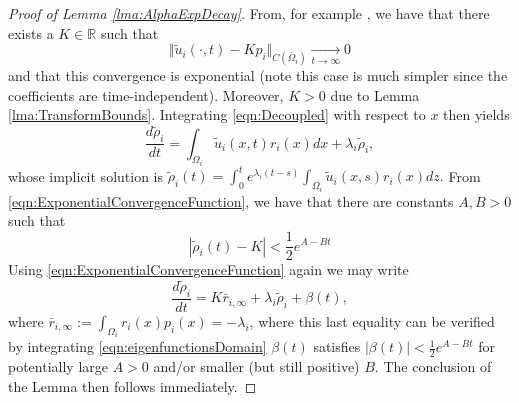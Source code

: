 \documentclass{article}
\def\strutdepth{\dp\strutbox}
\def \BVR#1{\strut\vadjust{\kern-\strutdepth\vtop to0pt{\vss\hbox to\hsize {\hskip\hsize\hskip5pt$\leftarrow$\hss\strut}}}{\em \textcolor{blue}{#1}}}
\begin{document}
\begin{proof}[Proof of Lemma \ref{lma:AlphaExpDecay}]
   From, for example \cite[Theorem 4.2.2]{lam2022introduction}, we have that there exists a
  $K\in\mathbb{R}$  such that \begin{equation}\label{eqn:ExponentialConvergenceFunction}
      \Vert{}\tilde{u}_i(\cdot,t)-Kp_i\Vert_{C(\overline{\Omega}_i)}\xrightarrow[t\rightarrow\infty]{}0
  \end{equation}and that this convergence is exponential (note this case is much simpler since the coefficients are time-independent). Moreover, $K>0$ due to Lemma \ref{lma:TransformBounds}. Integrating \eqref{eqn:Decoupled} with respect to $x$ then yields
  \[\frac{d\tilde{\rho}_i}{dt}=\int_{\Omega_i}\tilde{u}_i(x,t)r_i(x)dx+\lambda_i\tilde{\rho}_i,\]
whose implicit solution is $\tilde{\rho}_i(t)=\int_{0}^{t}e^{\lambda_i(t-s)}\int_{\Omega_i}\tilde{u}_i(x,s)r_i(x)dz.$ From \eqref{eqn:ExponentialConvergenceFunction}, we have that there are constants $A,B>0$ such that \begin{equation}
    \left|\tilde{\rho}_i(t)-K\right|<\frac{1}{2}e^{A-Bt}
\end{equation} 
Using \eqref{eqn:ExponentialConvergenceFunction} again we may write
  \[\frac{d\tilde{\rho}_i}{dt}=K\bar{r}_{i,\infty}+\lambda_i\tilde{\rho}_i+\beta(t),\]
  where $\bar{r}_{i,\infty}:=\int_{\Omega_i}r_i(x)p_i(x)=-\lambda_i$, where this last equality can be verified by integrating \eqref{eqn:eigenfunctionsDomain} $\beta(t)$ satisfies $\left|\beta(t)\right|<\frac{1}{2}e^{A-Bt}$ for potentially large $A>0$ and/or smaller (but still positive) $B$. The conclusion of the Lemma then follows immediately.
  
 




\end{proof}
\end{document}
